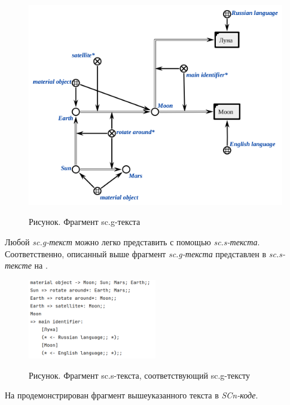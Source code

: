 \begin{figure}
	\centering
	\caption{Рисунок. Фрагмент sc.g-текста}
	\includegraphics[scale=0.8]{images/intro/scs/example_transf_scg.png}
	\label{scg_example_scs}
\end{figure}

Любой \textit{sc.g-текст} можно легко представить с помощью \textit{sc.s-текста}. Соответственно, описанный выше фрагмент \textit{sc.g-текста} представлен в \textit{sc.s-тексте} на \textit{}.

\begin{figure}
	\centering
	\caption{Рисунок. Фрагмент sc.s-текста, соответствующий sc.g-тексту}
	\includegraphics[width=0.5\textwidth]{images/intro/scs/example_transf_scs.png}
	\label{scg_example_scs1}
\end{figure}

На \textit{} продемонстрирован фрагмент вышеуказанного текста в \textit{SCn-коде}.


